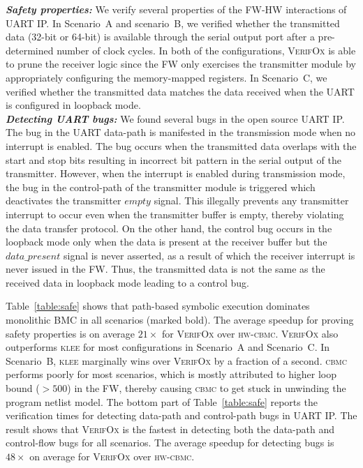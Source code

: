 \documentclass[sigconf]{acmart}
\newcommand{\tool}[1]{\textsc{#1}\xspace}
\newcommand{\cbmcv}{\tool{cbmc}}
\newcommand{\hwcbmcv}{\tool{hw-cbmc}}
\newcommand{\verifox}{\tool{VerifOx}}
\newcommand{\klee}{\tool{klee}}
\begin{document}
\textbf{\emph{Safety properties:}}
We verify several properties of the FW-HW interactions of UART IP. 
In Scenario~A and scenario~B, we verified whether
the transmitted data (32-bit or 64-bit) is available through the serial
output port after a pre-determined number of clock cycles.
In both of the
configurations, \verifox is able to prune the receiver logic since the
FW only exercises the transmitter module by appropriately configuring
the memory-mapped registers.  In Scenario~C, we verified whether the transmitted
data matches the data received when the UART is configured in loopback
mode.\\ 
\textbf{\emph{Detecting UART bugs:}}
We found several bugs in the open source UART IP. 
The bug in the UART data-path is manifested in the transmission mode when no
interrupt is enabled.  The bug occurs when the transmitted data overlaps
with the start and stop bits resulting in incorrect bit pattern in the
serial output of the transmitter.  However, when the interrupt is enabled
during transmission mode, the bug in the control-path of the transmitter
module is triggered which deactivates the transmitter $empty$ signal.  This
illegally prevents any transmitter interrupt to occur even when the
transmitter buffer is empty, thereby violating the data transfer protocol. 
On the other hand, the control bug occurs in the loopback mode only when the
data is present at the receiver buffer but the $data\_present$ signal is
never asserted, as a result of which the receiver interrupt is never issued
in the FW. Thus, the transmitted data is not the same as the received
data in loopback mode leading to a control bug.

Table~\ref{table:safe} shows that path-based symbolic execution dominates
monolithic BMC in all scenarios (marked bold).  The average speedup for
proving safety properties is on average $21\times$ for \verifox over
\hwcbmcv.  \verifox also outperforms \klee for most configurations in
Scenario~A and Scenario~C.  In Scenario~B, \klee marginally wins over
\verifox by a fraction of a second.  \cbmcv performs poorly for most
scenarios, which is mostly attributed to higher loop bound ($>500$) in the
FW, thereby causing \cbmcv to get stuck in unwinding the program netlist
model.  The bottom part of Table~\ref{table:safe} reports the verification
times for detecting data-path and control-path bugs in UART IP.  The result
shows that \verifox is the fastest in detecting both the data-path and
control-flow bugs for all scenarios.  The average speedup for detecting bugs
is $48\times$ on average for \verifox over \hwcbmcv.
\end{document}
